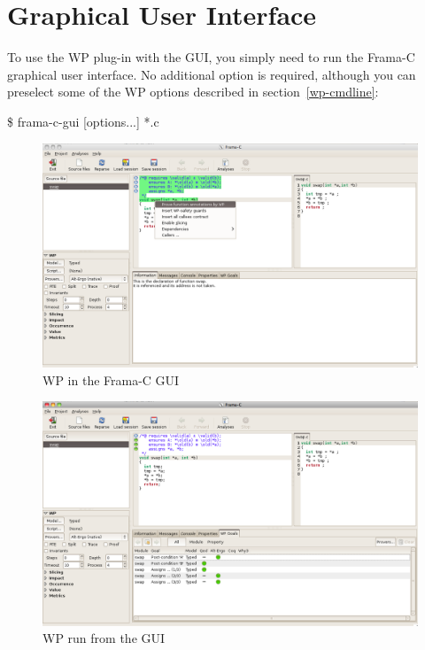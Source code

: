 \clearpage
\section{Graphical User Interface}
\label{wp-gui}

\newcommand{\loadicon}[1]{\raisebox{-3pt}{\rule{0pt}{13pt}\texttt{[image: \#1]}}}

To use the \textsf{WP} plug-in with the GUI, you simply need to run the
\textsf{Frama-C} graphical user interface. No additional option is
required, although you can preselect some of the \textsf{WP} options
described in section~\ref{wp-cmdline}:

\begin{shell}
  \$ frama-c-gui [options...] *.c
\end{shell}

\begin{figure}[p]
\begin{center}
\includegraphics[width=\textwidth]{wp-gui-main.png}
\end{center}
\caption{\textsf{WP} in the Frama-C GUI}
\label{wp-gui-panel}
\end{figure}

\begin{figure}[p]
\begin{center}
\includegraphics[width=\textwidth]{wp-gui-run.png}
\end{center}
\caption{\textsf{WP} run from the GUI}
\label{wp-gui-run}
\end{figure}

